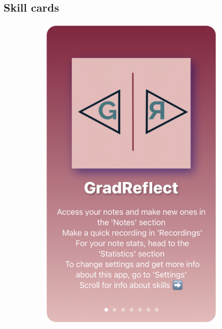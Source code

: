 \documentclass{l4proj}
\begin{document}
\begin{appendices}
%

\section{Skill cards}\label{Appendix-SkillCards}

\begin{figure}[H]
    \centering
    \begin{subfigure}[b]{0.3\textwidth}
        \includegraphics[scale=0.2]{images/HomeCard.pdf}

\end{subfigure}
\end{figure}
\end{appendices}
\end{document}
